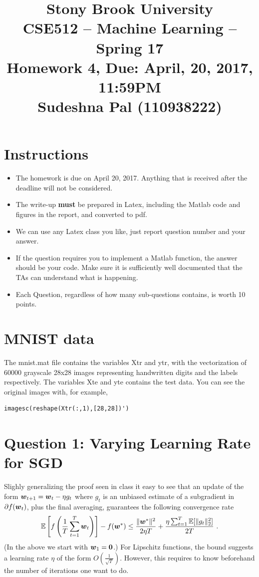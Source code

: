\documentclass{article}
\title{\bf Stony Brook University \\ CSE512 -- Machine Learning -- Spring 17 \\  
Homework 4, Due: April, 20, 2017, 11:59PM \\
Sudeshna Pal (110938222)}
\date{\vspace{-1cm}}
\begin{document}
\maketitle

\section*{Instructions}
\begin{itemize}
\item The homework is due on April 20, 2017. Anything that is received after the deadline will not be considered.
\item The write-up \textbf{must} be prepared in Latex, including the Matlab code and figures in the report, and converted to pdf.
\item We can use any Latex class you like, just report question number and your answer.
\item If the question requires you to implement a Matlab function, the answer should be your code. Make sure it is sufficiently well documented that the TAs can understand what is happening.
\item Each Question, regardless of how many sub-questions contains, is worth 10 points.
\end{itemize}

\section*{MNIST data}
The mnist.mat file contains the variables Xtr and ytr, with the vectorization of 60000 grayscale  28x28 images representing handwritten digits and the labels respectively.
The variables Xte and yte contains the test data.
You can see the original images with, for example, 
\begin{verbatim}
imagesc(reshape(Xtr(:,1),[28,28])')
\end{verbatim}


\section{Question 1: Varying Learning Rate for SGD}
Slighly generalizing the proof seen in class it easy to see that an update of the form $\boldsymbol{w}_{t+1}=\boldsymbol{w}_t-\eta g_t$ where $g_t$ is an unbiased estimate of a subgradient in $\partial f(\boldsymbol{w}_t)$, plus the final averaging, guarantees the following convergence rate
\[
\mathbb{E}\left[f\left(\frac{1}{T}\sum_{t=1}^T \boldsymbol{w}_t\right)\right] - f(\boldsymbol{w}^*)\leq\frac{\|\boldsymbol{w}^*\|^2}{2\eta T}+\frac{\eta \sum_{t=1}^T\mathbb{E}[\|g_t\|_2^2]}{2T}~.
\]
(In the above we start with $\boldsymbol{w}_1=\boldsymbol{0}$.)
For Lipschitz functions, the bound suggests a learning rate $\eta$ of the form $O(\frac{1}{\sqrt{T}})$. However, this requires to know beforehand the number of iterations one want to do.
\end{document}
